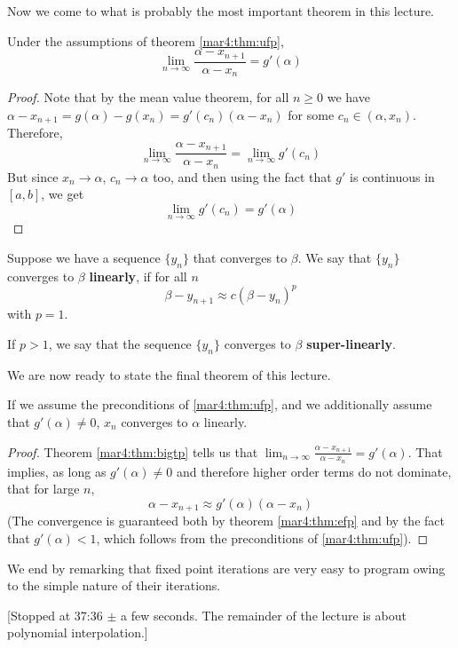 Now we come to what is probably the most important theorem in this lecture.
\begin{thm}
  Under the assumptions of theorem \ref{mar4:thm:ufp},
  \label{mar4:thm:bigtp}
  \[
    \lim_{n\to\infty} \frac{\alpha - x_{n+1}}{\alpha - x_n} = g'(\alpha)
  \]
\end{thm}
\begin{proof}
  Note that by the mean value theorem, for all $n \geq 0$ we have $\alpha - x_{n+1} = g(\alpha) - g(x_n) = g'(c_n)(\alpha - x_n)$ for some $c_n \in (\alpha, x_n)$. Therefore,
  \[
    \lim_{n\to\infty} \frac{\alpha - x_{n+1}}{\alpha - x_n} = \lim_{n\to\infty} g'(c_n)
  \]
  But since $x_n \to \alpha$, $c_n \to \alpha$ too, and then using the fact that $g'$ is continuous in $[a, b]$, we get
  \[
    \lim_{n\to\infty} g'(c_n) = g'(\alpha)
  \]
  \hfill
\end{proof}

\begin{defn}
  Suppose we have a sequence $\{y_n \}$ that converges to $\beta$. We say that $\{y_n \}$ converges to $\beta$ \textbf{linearly}, if for all $n$
  \[
    \beta - y_{n+1} \approx c(\beta - y_n)^p
  \]
  with $p = 1$.

  If $p > 1$, we say that the sequence $\{y_n \}$ converges to $\beta$ \textbf{super-linearly}.
\end{defn}
We are now ready to state the final theorem of this lecture.
\begin{thm}
  If we assume the preconditions of \ref{mar4:thm:ufp}, and we additionally assume that $g'(\alpha) \neq 0$, $x_n$ converges to $\alpha$ linearly.
\end{thm}
\begin{proof}
  Theorem \ref{mar4:thm:bigtp} tells us that $\lim_{n\to\infty} \frac{\alpha - x_{n+1}}{\alpha - x_n} = g'(\alpha)$. That implies, as long as $g'(\alpha) \neq 0$ and therefore higher order terms do not dominate, that for large $n$,
  \[
    \alpha - x_{n+1} \approx g'(\alpha)(\alpha - x_n)
  \]
  (The convergence is guaranteed both by theorem \ref{mar4:thm:efp} and by the fact that $g'(\alpha) < 1$, which follows from the preconditions of \ref{mar4:thm:ufp}).
\hfill
\end{proof}

We end by remarking that fixed point iterations are very easy to program owing to the simple nature of their iterations.

[Stopped at 37:36 $\pm$ a few seconds. The remainder of the lecture is about polynomial interpolation.]

